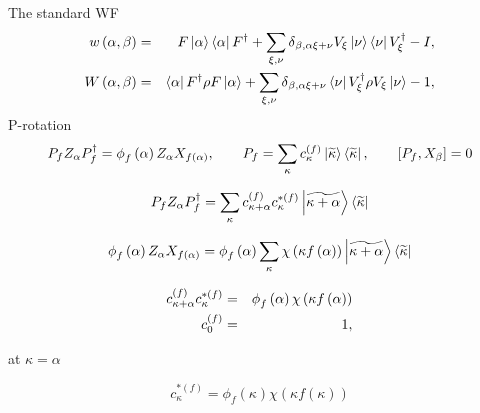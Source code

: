\documentclass{article}
\begin{document}
The standard WF%
\begin{eqnarray}
w\left( \alpha ,\beta \right)  &=&F\left\vert \alpha \right\rangle
\left\langle \alpha \right\vert F^{\dag }+\dsum\limits_{\xi ,\nu }\delta
_{\beta ,\alpha \xi +\nu }V_{\xi }\left\vert \nu \right\rangle \left\langle
\nu \right\vert V_{\xi }^{\dag }-I,  \label{_I001c} \\
W\left( \alpha ,\beta \right)  &=&\left\langle \alpha \right\vert F^{\dag
}\rho F\left\vert \alpha \right\rangle +\dsum\limits_{\xi ,\nu }\delta
_{\beta ,\alpha \xi +\nu }\left\langle \nu \right\vert V_{\xi }^{\dag }\rho
V_{\xi }\left\vert \nu \right\rangle -1,
\end{eqnarray}%
P-rotation%
\begin{equation*}
P_{f}Z_{\alpha }P_{f}^{\dag }=\phi _{f}\left( \alpha \right) Z_{\alpha
}X_{f\left( \alpha \right) },\qquad P_{f}=\dsum\limits_{\kappa }c_{\kappa
}^{\left( f\right) }\left\vert \widetilde{\kappa }\right\rangle \left\langle 
\widetilde{\kappa }\right\vert ,\qquad \left[ P_{f},X_{\beta }\right] =0
\end{equation*}

\begin{equation*}
P_{f}Z_{\alpha }P_{f}^{\dag }=\dsum\limits_{\kappa }c_{\kappa +\alpha
}^{\left( f\right) }c_{\kappa }^{\ast \left( f\right) }\left\vert \widetilde{%
\kappa +\alpha }\right\rangle \left\langle \widetilde{\kappa }\right\vert 
\end{equation*}

\begin{equation*}
\phi _{f}\left( \alpha \right) Z_{\alpha }X_{f\left( \alpha \right) }=\phi
_{f}\left( \alpha \right) \dsum\limits_{\kappa }\chi \left( \kappa f\left(
\alpha \right) \right) \left\vert \widetilde{\kappa +\alpha }\right\rangle
\left\langle \widetilde{\kappa }\right\vert 
\end{equation*}

\begin{eqnarray}
c_{\kappa +\alpha }^{\left( f\right) }c_{\kappa }^{\ast \left( f\right) }
&=&\phi _{f}\left( \alpha \right) \chi \left( \kappa f\left( \alpha \right)
\right)  \notag \\
c_{0}^{\left( f\right) } &=&1,
\end{eqnarray}

at $\kappa =\alpha $

\begin{equation*}
c_{\kappa }^{\ast \left( f\right) }=\phi _{f}\left( \kappa \right) \chi
\left( \kappa f\left( \kappa \right) \right) 
\end{equation*}
\end{document}
